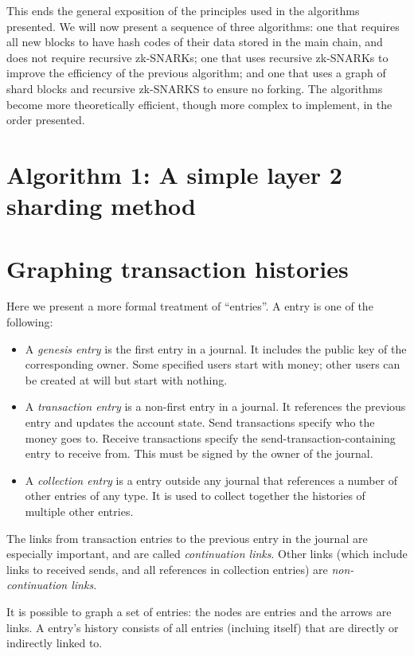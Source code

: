 \documentclass{article}
\begin{document}
This ends the general exposition of the principles used in the algorithms presented.  We will now present a sequence of three algorithms: one that requires all new blocks to have hash codes of their data stored in the main chain, and does not require recursive zk-SNARKs; one that uses recursive zk-SNARKs to improve the efficiency of the previous algorithm; and one that uses a graph of shard blocks and recursive zk-SNARKS to ensure no forking.  The algorithms become more theoretically efficient, though more complex to implement, in the order presented.

\section{Algorithm 1: A simple layer 2 sharding method}


\section{Graphing transaction histories}

Here we present a more formal treatment of ``entries''.  A entry is one of the following:

\begin{itemize}
  \item A \emph{genesis entry} is the first entry in a journal.  It includes the public key of the corresponding owner.  Some specified users start with money; other users can be created at will but start with nothing.
  \item A \emph{transaction entry} is a non-first entry in a journal.  It references the previous entry and updates the account state.  Send transactions specify who the money goes to.  Receive transactions specify the send-transaction-containing entry to receive from.  This must be signed by the owner of the journal.
  \item A \emph{collection entry} is a entry outside any journal that references a number of other entries of any type.  It is used to collect together the histories of multiple other entries.
\end{itemize}

The links from transaction entries to the previous entry in the journal are especially important, and are called \emph{continuation links}.  Other links (which include links to received sends, and all references in collection entries) are \emph{non-continuation links}.

It is possible to graph a set of entries: the nodes are entries and the arrows are links.  A entry's history consists of all entries (incluing itself) that are directly or indirectly linked to.
\end{document}
